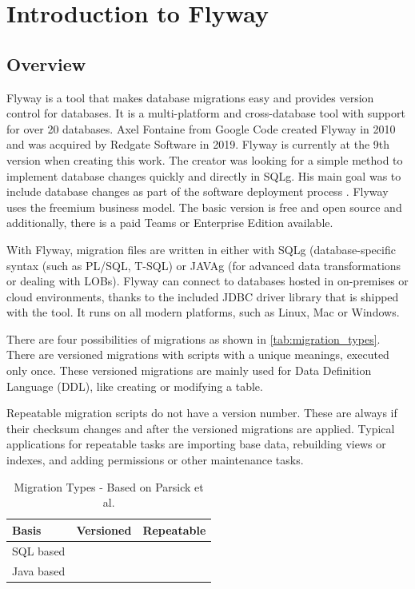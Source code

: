 

\chapter{Introduction to Flyway}


\section{Overview}
%
Flyway is a tool that makes database migrations easy and provides version control for databases. It is a multi-platform and cross-database tool with support for over 20 databases.
Axel Fontaine from Google Code created Flyway in 2010 and was acquired by Redgate Software in 2019. Flyway is currently at the 9th version when creating this work. The creator was looking for a simple method to implement database changes quickly and directly in \gls{SQLg}. His main goal was to include database changes as part of the software deployment process \cite{Robles2021}.
Flyway uses the freemium business model. The basic version is free and open source \cite{Fontaine2010} and additionally, there is a paid Teams or Enterprise Edition available.

With Flyway, migration files are written in either with \gls{SQLg} (database-specific syntax (such as PL/SQL, T-SQL) or \gls{JAVAg} (for advanced data transformations or dealing with LOBs). Flyway can connect to databases hosted in on-premises or cloud environments, thanks to the included JDBC driver library that is shipped with the tool. It runs on all modern platforms, such as Linux, Mac or Windows.  \cite{Dillon2022} \cite{DBMSTools}


%
There are four possibilities of migrations as shown in \autoref{tab:migration_types}. There are versioned migrations with scripts with a unique meanings, executed only once. These versioned migrations are mainly used for Data Definition Language (DDL), like creating or modifying a table.

Repeatable migration scripts do not have a version number. These are always if their checksum changes and after the versioned migrations are applied. Typical applications for repeatable tasks are importing base data, rebuilding views or indexes, and adding permissions or other maintenance tasks.

\begin{table}[h]
	\centering
	\begin{tabularx}{8cm}{X c c}
		Basis & Versioned & Repeatable \\ \toprule
		SQL based & \checkmark & \checkmark \\
		Java based & \checkmark & \checkmark \\
	\end{tabularx}
	\caption{Migration Types - Based on Parsick et al. \cite{Parsick2018}}
	\label{tab:migration_types}
\end{table}

